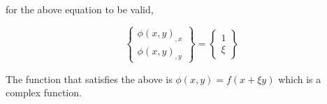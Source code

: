 for the above equation to be valid, 

\begin{equation*}
    \begin{Bmatrix}
    \phi(x, y)_{,x}\\ 
    \phi(x, y)_{,y}
    \end{Bmatrix} = 
    \begin{Bmatrix}
    1\\ 
    \xi
    \end{Bmatrix}
\end{equation*}

The function that satisfies the above is $\phi(x, y) = f(x + \xi y)$ which is a complex function.



